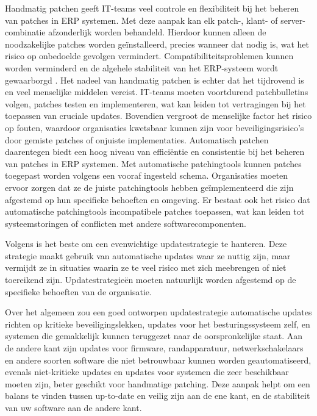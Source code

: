 Handmatig patchen geeft IT-teams veel controle en flexibiliteit bij het beheren van patches in ERP systemen. Met deze aanpak kan elk patch-, klant- of server-combinatie afzonderlijk worden behandeld. Hierdoor kunnen alleen de 
noodzakelijke patches worden geïnstalleerd, precies wanneer dat nodig is, wat het risico op onbedoelde gevolgen vermindert. Compatibiliteitsproblemen kunnen worden verminderd en de algehele stabiliteit van het ERP-systeem wordt gewaarborgd \autocite{Hooper2018}.
Het nadeel van handmatig patchen is echter dat het tijdrovend is en veel menselijke middelen vereist. IT-teams moeten voortdurend patchbulletins volgen, patches testen en implementeren, wat kan leiden tot vertragingen bij het 
toepassen van cruciale updates. Bovendien vergroot de menselijke factor het risico op fouten, waardoor organisaties kwetsbaar kunnen zijn voor beveiligingsrisico’s door gemiste patches of onjuiste implementaties. Automatisch patchen daarentegen biedt een hoog niveau van efficiëntie en consistentie bij het beheren van patches in ERP systemen. Met automatische patchingtools
kunnen patches toegepast worden volgens een vooraf ingesteld schema. Organisaties moeten ervoor zorgen dat ze de juiste patchingtools hebben geïmplementeerd die zijn afgestemd op hun specifieke behoeften en omgeving. Er bestaat ook het risico dat automatische patchingtools incompatibele patches toepassen, wat kan leiden tot systeemstoringen of conflicten met andere softwarecomponenten.

Volgens \textcite{Tozzi2017} is het beste om een evenwichtige updatestrategie te hanteren. Deze strategie maakt gebruik van automatische updates waar ze nuttig zijn, maar vermijdt ze in situaties waarin ze te veel risico met zich meebrengen
 of niet toereikend zijn. Updatestrategieën moeten natuurlijk worden afgestemd op de specifieke behoeften van de organisatie.

Over het algemeen zou een goed ontworpen updatestrategie automatische updates richten op kritieke beveiligingslekken, updates voor het besturingssysteem zelf, en systemen die gemakkelijk kunnen teruggezet naar de oorspronkelijke staat. Aan de andere kant 
zijn updates voor firmware, randapparatuur, netwerkschakelaars en andere soorten software die niet betrouwbaar kunnen worden geautomatiseerd, evenals niet-kritieke updates en updates voor systemen die zeer beschikbaar moeten zijn, beter geschikt voor handmatige patching.
Deze aanpak helpt om een balans te vinden tussen up-to-date en veilig zijn aan de ene kant, en de stabiliteit van uw software aan de andere kant.


